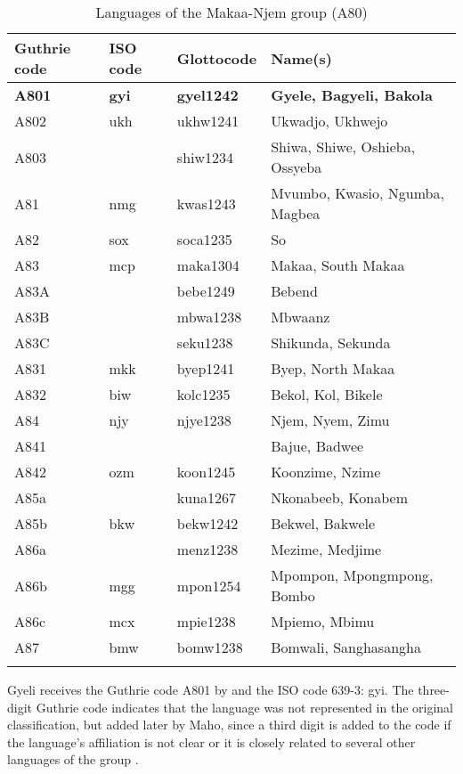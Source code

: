 \begin{table}

\begin{tabularx}{\textwidth}{lllX}
\lsptoprule
Guthrie code & ISO code & Glottocode &  Name(s) \\ 
 \midrule
{\bfseries A801} & {\bfseries gyi} & {\bfseries gyel1242} & {\bfseries Gyele, Bagyeli, Bakola} \\
A802 & ukh & ukhw1241 & Ukwadjo, Ukhwejo \\
A803 &      & shiw1234 & Shiwa, Shiwe, Oshieba, Ossyeba\\
A81 &  nmg  & kwas1243 &  Mvumbo, Kwasio, Ngumba, Magbea\\
A82 & sox & soca1235 & So \\
A83 & mcp & maka1304 &  Makaa, South Makaa \\
A83A &   & bebe1249 &  Bebend \\
A83B &    & mbwa1238 & Mbwaanz \\
A83C &    & seku1238 & Shikunda, Sekunda \\
A831 & mkk & byep1241 & Byep, North Makaa \\
A832 & biw & kolc1235 & Bekol, Kol, Bikele  \\
A84 & njy  &  njye1238 & Njem, Nyem, Zimu \\
A841 &   &  & Bajue, Badwee \\
A842 & ozm  & koon1245 & Koonzime, Nzime \\
A85a &      & kuna1267 & Nkonabeeb, Konabem \\
A85b & bkw & bekw1242 & Bekwel, Bakwele \\
A86a &  &  menz1238 & Mezime, Medjime \\
A86b & mgg & mpon1254 &  Mpompon, Mpongmpong, Bombo \\
A86c  & mcx & mpie1238 & Mpiemo, Mbimu \\
A87  & bmw &  bomw1238 & Bomwali, Sanghasangha \\
\lspbottomrule
\end{tabularx}
\caption{Languages of the Makaa-Njem group (A80)}
\label{Tab:A80}
\end{table}

Gyeli receives the Guthrie code A801 by \citet{maho2001} and the ISO code 639-3: gyi.   The  three-digit Guthrie code indicates that the language was not represented in the original classification, but added later by Maho, since a third digit is added to the code if the language's affiliation is not clear or it is closely related to several other languages of the group  \citep[46]{maho2001}.

